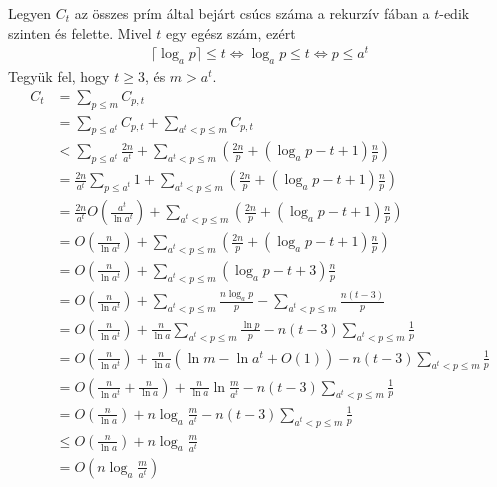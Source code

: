 \documentclass[12pt]{report}
\begin{document}
Legyen $C_t$ az összes prím által bejárt csúcs száma
a rekurzív fában a $t$-edik szinten és felette.
Mivel $t$ egy egész szám, ezért
\begin{align*}
\lceil \log_{a}{p} \rceil \le t
\Leftrightarrow \log_{a}{p} \le t
\Leftrightarrow p \le a^t
\end{align*}
Tegyük fel, hogy $t \ge 3$, és $m > a^t$.
\begin{align*}
C_t &= \sum_{p \le m} C_{p,t} \\
&= \sum_{p \le a^t} C_{p,t} + \sum_{a^t < p \le m} C_{p,t} \\
&< \sum_{p \le a^t} \frac{2n}{a^t}
  + \sum_{a^t < p \le m} \left( \frac{2n}{p} + (\log_{a}{p} - t + 1) \frac{n}{p} \right) \\
&= \frac{2n}{a^t} \sum_{p \le a^t} 1
  + \sum_{a^t < p \le m} \left( \frac{2n}{p} + (\log_{a}{p} - t + 1) \frac{n}{p} \right) \\
&= \frac{2n}{a^t} O\left( \frac{a^t}{\ln{a^t}} \right)
  + \sum_{a^t < p \le m} \left( \frac{2n}{p} + (\log_{a}{p} - t + 1) \frac{n}{p} \right) \\
&= O\left( \frac{n}{\ln{a^t}} \right)
  + \sum_{a^t < p \le m} \left( \frac{2n}{p} + (\log_{a}{p} - t + 1) \frac{n}{p} \right) \\
&= O\left( \frac{n}{\ln{a^t}} \right)
  + \sum_{a^t < p \le m} (\log_{a}{p} - t + 3) \frac{n}{p} \\
&= O\left( \frac{n}{\ln{a^t}} \right)
  + \sum_{a^t < p \le m} \frac{n \log_{a}{p}}{p}
  - \sum_{a^t < p \le m} \frac{n (t - 3)}{p} \\
&= O\left( \frac{n}{\ln{a^t}} \right)
  + \frac{n}{\ln{a}} \sum_{a^t < p \le m} \frac{\ln{p}}{p}
  - n (t - 3) \sum_{a^t < p \le m} \frac{1}{p} \\
&= O\left( \frac{n}{\ln{a^t}} \right)
  + \frac{n}{\ln{a}} \left( \ln{m} - \ln{a^t} + O(1) \right)
  - n (t - 3) \sum_{a^t < p \le m} \frac{1}{p} \\
&= O\left( \frac{n}{\ln{a^t}} + \frac{n}{\ln{a}} \right)
  + \frac{n}{\ln{a}} \ln{\frac{m}{a^t}}
  - n (t - 3) \sum_{a^t < p \le m} \frac{1}{p} \\
&= O\left( \frac{n}{\ln{a}} \right)
  + n \log_{a}{\frac{m}{a^t}}
  - n (t - 3) \sum_{a^t < p \le m} \frac{1}{p} \\
&\le O\left( \frac{n}{\ln{a}} \right)
  + n \log_{a}{\frac{m}{a^t}} \\
&= O\left( n \log_{a}{\frac{m}{a^t}} \right)
\end{align*}
\end{document}
